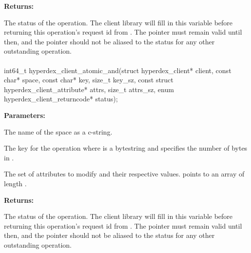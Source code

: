 \noindent\textbf{Returns:}
\begin{description}[labelindent=\widthof{{\code{status}}},leftmargin=*,noitemsep,nolistsep,align=right]
\item[\code{status}] The status of the operation.  The client library will fill in this variable before returning this operation's request id from .  The pointer must remain valid until then, and the pointer should not be aliased to the status for any other outstanding operation.
\end{description}

\paragraph{}
\label{api:c:atomic_and}
\begin{ccode}
int64_t hyperdex_client_atomic_and(struct hyperdex_client* client,
        const char* space,
        const char* key, size_t key_sz,
        const struct hyperdex_client_attribute* attrs, size_t attrs_sz,
        enum hyperdex_client_returncode* status);
\end{ccode}
\funcdesc 

\noindent\textbf{Parameters:}
\begin{description}[labelindent=\widthof{{\code{attrs}, \code{attrs\_sz}}},leftmargin=*,noitemsep,nolistsep,align=right]
\item[\code{space}] The name of the space as a c-string.
\item[\code{key}, \code{key\_sz}] The key for the operation where  is a bytestring and  specifies the number of bytes in .
\item[\code{attrs}, \code{attrs\_sz}] The set of attributes to modify and their respective values.   points to an array of length .
\end{description}

\noindent\textbf{Returns:}
\begin{description}[labelindent=\widthof{{\code{status}}},leftmargin=*,noitemsep,nolistsep,align=right]
\item[\code{status}] The status of the operation.  The client library will fill in this variable before returning this operation's request id from .  The pointer must remain valid until then, and the pointer should not be aliased to the status for any other outstanding operation.
\end{description}

